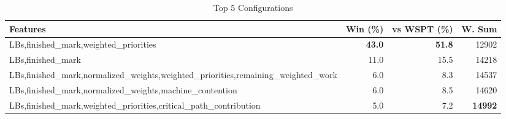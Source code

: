 \begin{table}[htbp]%
\centering%
\begin{tabular}{lrrr}%
\toprule%
\textbf{Features}&\textbf{Win (\%)}&\textbf{vs WSPT (\%)}&\textbf{W. Sum}\\%
\midrule%
LBs,finished_mark,weighted_priorities&\textbf{43.0}&\textbf{51.8}&12902\\%
LBs,finished_mark&11.0&15.5&14218\\%
LBs,finished_mark,normalized_weights,weighted_priorities,remaining_weighted_work&6.0&8.3&14537\\%
LBs,finished_mark,normalized_weights,machine_contention&6.0&8.5&14620\\%
LBs,finished_mark,weighted_priorities,critical_path_contribution&5.0&7.2&\textbf{14992}\\%
\bottomrule%
\end{tabular}%
\caption{Top 5 Configurations}%
\label{tab:summary}%
\end{table}
